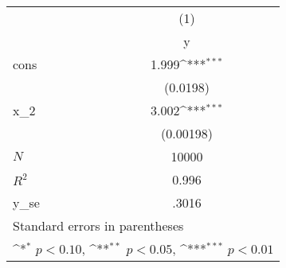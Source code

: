 {
\def\sym#1{\ifmmode^{#1}\else\(^{#1}\)\fi}
\begin{tabular}{l*{1}{c}}
\hline\hline
            &\multicolumn{1}{c}{(1)}\\
            &\multicolumn{1}{c}{y}\\
\hline
cons        &       1.999\sym{***}\\
            &    (0.0198)         \\
[1em]
x\_2         &       3.002\sym{***}\\
            &   (0.00198)         \\
\hline
\(N\)       &       10000         \\
\(R^{2}\)   &       0.996         \\
y\_se        &       .3016         \\
\hline\hline
\multicolumn{2}{l}{\footnotesize Standard errors in parentheses}\\
\multicolumn{2}{l}{\footnotesize \sym{*} \(p<0.10\), \sym{**} \(p<0.05\), \sym{***} \(p<0.01\)}\\
\end{tabular}
}
